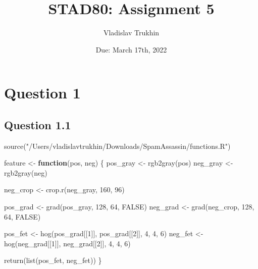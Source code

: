 \documentclass[
]{article}
\title{STAD80: Assignment 5}
\author{Vladislav Trukhin}
\date{Due: March 17th, 2022}
\newenvironment{Shaded}{\begin{snugshade}}{\end{snugshade}}
\newcommand{\ConstantTok}[1]{\textcolor[rgb]{0.00,0.00,0.00}{#1}}
\newcommand{\ControlFlowTok}[1]{\textcolor[rgb]{0.13,0.29,0.53}{\textbf{#1}}}
\newcommand{\DecValTok}[1]{\textcolor[rgb]{0.00,0.00,0.81}{#1}}
\newcommand{\FunctionTok}[1]{\textcolor[rgb]{0.00,0.00,0.00}{#1}}
\newcommand{\NormalTok}[1]{#1}
\newcommand{\OtherTok}[1]{\textcolor[rgb]{0.56,0.35,0.01}{#1}}
\newcommand{\StringTok}[1]{\textcolor[rgb]{0.31,0.60,0.02}{#1}}
\begin{document}
\maketitle

{
\setcounter{tocdepth}{2}
\tableofcontents
}
\hypertarget{question-1}{%
\section{Question 1}\label{question-1}}

\hypertarget{question-1.1}{%
\subsection{Question 1.1}\label{question-1.1}}

\begin{Shaded}
\begin{Highlighting}[]
\FunctionTok{source}\NormalTok{(}\StringTok{"/Users/vladislavtrukhin/Downloads/SpamAssassin/functions.R"}\NormalTok{)}
\end{Highlighting}
\end{Shaded}

\begin{Shaded}
\begin{Highlighting}[]
\NormalTok{feature }\OtherTok{\textless{}{-}} \ControlFlowTok{function}\NormalTok{(pos, neg) \{}
\NormalTok{  pos\_gray }\OtherTok{\textless{}{-}} \FunctionTok{rgb2gray}\NormalTok{(pos)}
\NormalTok{  neg\_gray }\OtherTok{\textless{}{-}} \FunctionTok{rgb2gray}\NormalTok{(neg)}
  
\NormalTok{  neg\_crop }\OtherTok{\textless{}{-}} \FunctionTok{crop.r}\NormalTok{(neg\_gray, }\DecValTok{160}\NormalTok{, }\DecValTok{96}\NormalTok{)}
  
\NormalTok{  pos\_grad }\OtherTok{\textless{}{-}} \FunctionTok{grad}\NormalTok{(pos\_gray, }\DecValTok{128}\NormalTok{, }\DecValTok{64}\NormalTok{, }\ConstantTok{FALSE}\NormalTok{) }
\NormalTok{  neg\_grad }\OtherTok{\textless{}{-}} \FunctionTok{grad}\NormalTok{(neg\_crop, }\DecValTok{128}\NormalTok{, }\DecValTok{64}\NormalTok{, }\ConstantTok{FALSE}\NormalTok{)}
  
\NormalTok{  pos\_fet }\OtherTok{\textless{}{-}} \FunctionTok{hog}\NormalTok{(pos\_grad[[}\DecValTok{1}\NormalTok{]], pos\_grad[[}\DecValTok{2}\NormalTok{]], }\DecValTok{4}\NormalTok{, }\DecValTok{4}\NormalTok{, }\DecValTok{6}\NormalTok{)}
\NormalTok{  neg\_fet }\OtherTok{\textless{}{-}} \FunctionTok{hog}\NormalTok{(neg\_grad[[}\DecValTok{1}\NormalTok{]], neg\_grad[[}\DecValTok{2}\NormalTok{]], }\DecValTok{4}\NormalTok{, }\DecValTok{4}\NormalTok{, }\DecValTok{6}\NormalTok{)}
  
  \FunctionTok{return}\NormalTok{(}\FunctionTok{list}\NormalTok{(pos\_fet, neg\_fet))}
\NormalTok{\}}
\end{Highlighting}
\end{Shaded}
\end{document}
